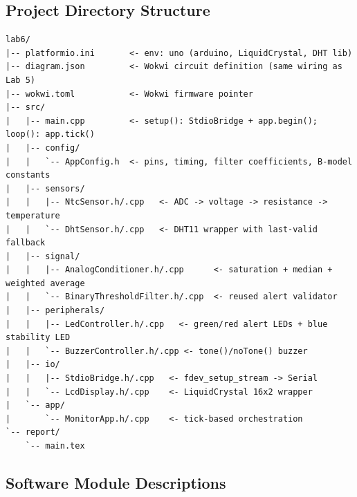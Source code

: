 \documentclass[12pt]{article}
\begin{document}
\subsection{Project Directory Structure}

\begin{verbatim}
lab6/
|-- platformio.ini       <- env: uno (arduino, LiquidCrystal, DHT lib)
|-- diagram.json         <- Wokwi circuit definition (same wiring as Lab 5)
|-- wokwi.toml           <- Wokwi firmware pointer
|-- src/
|   |-- main.cpp         <- setup(): StdioBridge + app.begin(); loop(): app.tick()
|   |-- config/
|   |   `-- AppConfig.h  <- pins, timing, filter coefficients, B-model constants
|   |-- sensors/
|   |   |-- NtcSensor.h/.cpp   <- ADC -> voltage -> resistance -> temperature
|   |   `-- DhtSensor.h/.cpp   <- DHT11 wrapper with last-valid fallback
|   |-- signal/
|   |   |-- AnalogConditioner.h/.cpp      <- saturation + median + weighted average
|   |   `-- BinaryThresholdFilter.h/.cpp  <- reused alert validator
|   |-- peripherals/
|   |   |-- LedController.h/.cpp   <- green/red alert LEDs + blue stability LED
|   |   `-- BuzzerController.h/.cpp <- tone()/noTone() buzzer
|   |-- io/
|   |   |-- StdioBridge.h/.cpp   <- fdev_setup_stream -> Serial
|   |   `-- LcdDisplay.h/.cpp    <- LiquidCrystal 16x2 wrapper
|   `-- app/
|       `-- MonitorApp.h/.cpp    <- tick-based orchestration
`-- report/
    `-- main.tex
\end{verbatim}

\subsection{Software Module Descriptions}
\end{document}
